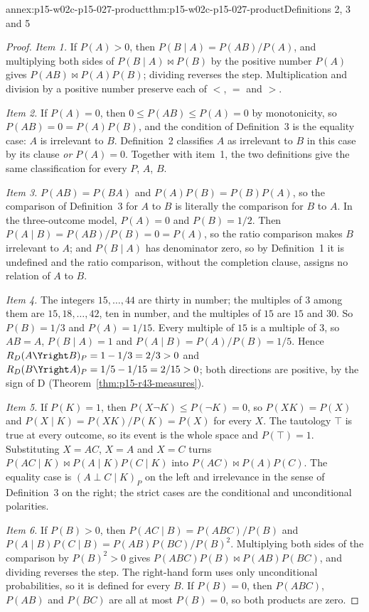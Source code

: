 \begin{annexitem}{annex:p15-w02c-p15-027-product}{thm:p15-w02c-p15-027-product}{Definitions 2, 3 and 5}
\begin{proof}
\emph{Item 1.} If \(P(A)>0\), then \(P(B\mid A)=P(AB)/P(A)\), and
multiplying both sides of \(P(B\mid A)\bowtie P(B)\) by the positive
number \(P(A)\) gives \(P(AB)\bowtie P(A)P(B)\); dividing reverses the
step. Multiplication and division by a positive number preserve each of
\(<\), \(=\) and \(>\).

\emph{Item 2.} If \(P(A)=0\), then \(0\leq P(AB)\leq P(A)=0\) by
monotonicity, so \(P(AB)=0=P(A)P(B)\), and the condition of
Definition~3 is the equality case: \(A\) is irrelevant to \(B\).
Definition~2 classifies \(A\) as irrelevant to \(B\) in this case by its
clause \emph{or \(P(A)=0\)}. Together with item~1, the two definitions
give the same classification for every \(P\), \(A\), \(B\).

\emph{Item 3.} \(P(AB)=P(BA)\) and \(P(A)P(B)=P(B)P(A)\), so the
comparison of Definition~3 for \(A\) to \(B\) is literally the comparison
for \(B\) to \(A\). In the three-outcome model, \(P(A)=0\) and
\(P(B)=1/2\). Then \(P(A\mid B)=P(AB)/P(B)=0=P(A)\), so the ratio
comparison makes \(B\) irrelevant to \(A\); and \(P(B\mid A)\) has
denominator zero, so by Definition~1 it is undefined and the ratio
comparison, without the completion clause, assigns no relation of \(A\)
to \(B\).

\emph{Item 4.} The integers \(15,\ldots,44\) are thirty in number; the
multiples of \(3\) among them are \(15,18,\ldots,42\), ten in number, and
the multiples of \(15\) are \(15\) and \(30\). So \(P(B)=1/3\) and
\(P(A)=1/15\). Every multiple of \(15\) is a multiple of \(3\), so
\(AB=A\), \(P(B\mid A)=1\) and \(P(A\mid B)=P(A)/P(B)=1/5\). Hence
\(R_D(A\Yright B)_P=1-1/3=2/3>0\) and
\(R_D(B\Yright A)_P=1/5-1/15=2/15>0\); both directions are positive, by
the sign of D (Theorem~\ref{thm:p15-r43-measures}).

\emph{Item 5.} If \(P(K)=1\), then \(P(X\neg K)\leq P(\neg K)=0\), so
\(P(XK)=P(X)\) and \(P(X\mid K)=P(XK)/P(K)=P(X)\) for every \(X\). The
tautology \(\top\) is true at every outcome, so its event is the whole
space and \(P(\top)=1\). Substituting \(X=AC\), \(X=A\) and \(X=C\) turns
\(P(AC\mid K)\bowtie P(A\mid K)P(C\mid K)\) into
\(P(AC)\bowtie P(A)P(C)\). The equality case is
\((A\perp C\mid K)_P\) on the left and irrelevance in the sense of
Definition~3 on the right; the strict cases are the conditional and
unconditional polarities.

\emph{Item 6.} If \(P(B)>0\), then
\(P(AC\mid B)=P(ABC)/P(B)\) and
\(P(A\mid B)P(C\mid B)=P(AB)P(BC)/P(B)^2\). Multiplying both sides of
the comparison by \(P(B)^2>0\) gives
\(P(ABC)P(B)\bowtie P(AB)P(BC)\), and dividing reverses the step. The
right-hand form uses only unconditional probabilities, so it is defined
for every \(B\). If \(P(B)=0\), then \(P(ABC)\), \(P(AB)\) and \(P(BC)\)
are all at most \(P(B)=0\), so both products are zero.
\end{proof}
\end{annexitem}


